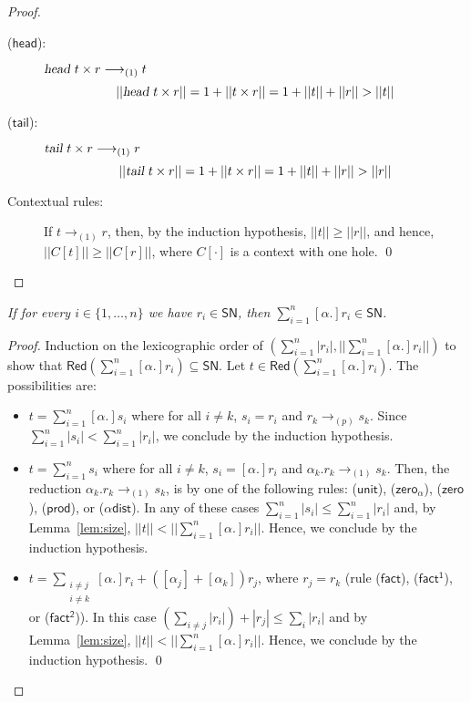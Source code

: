 \documentclass[preprint]{elsarticle}
\newcommand\size[1]{||#1||}
\newcommand\Red[1]{\mathsf{Red}(#1)}
\newcommand\SN{\mathsf{SN}}
\newcommand\lpl[1]{|#1|}
\newcommand\recap[3]{\noindent {\bf #1 \ref{#2}.} \emph{#3}}
\newcommand\lra[1][1]{\longrightarrow_{\left(#1\right)}}
\newcommand\lrap{\lra[p]}
\newcommand\s[1]{\ensuremath{\mathsf{#1}}}
\newcommand\head{\text{\sl head}}
\newcommand\tail{\text{\sl tail}}
\newcommand\may[1][\alpha]{[{#1}.]}
\newcommand\runit{(\s{unit})}
\newcommand\rzeros{(\s{zero_\alpha})}
\newcommand\rzero{(\s{zero})}
\newcommand\rprod{(\s{prod})}
\newcommand\rdists{(\s{\alpha dist})}
\newcommand\rfact{(\s{fact})}
\newcommand\rfacto{(\s{fact^1})}
\newcommand\rfactt{(\s{fact^2})}
\newcommand\rhead{(\s{head})}
\newcommand\rtail{(\s{tail})}
\begin{document}
\begin{proof}
\begin{description}
 \item[\rhead:] \( \head\ t \times r \lra t \)
   \[
     \size{\head\ t \times r} = 1 + \size{t \times r} = 1 + \size{t} + \size{r} > \size{t}
   \]
 \item[\rtail:] \( \tail\ {t \times r} \lra r \)
   \[
     \size{\tail\ {t \times r}} = 1 + \size{t \times r} = 1 + \size{t} + \size{r} > \size{r}
   \]
 \item[Contextual rules:] If $t\lra r$, then, by the induction hypothesis,
   $\size t\geq \size r$, and hence, $\size{C[t]}\geq \size{C[r]}$, where $C[\cdot]$ is
   a context with one hole.
    \qed
  \end{description}
\end{proof}

\recap{Lemma}{lem:ri_in_snset_implies_sum_ri_in_snset}{
  If for every \( i \in \{1, \ldots, n\} \) we have \( r_i \in \SN \),
  then \( \sum_{i = 1}^{n} \may r_i \in \SN \).
}
\begin{proof}
  Induction on the lexicographic order of \( (\sum_{i = 1}^{n} |r_i|,
  \size{\sum_{i = 1}^{n} \may r_i}) \) to show that \( \Red{\sum_{i =
      1}^{n}\may r_i} \subseteq \SN \). Let $t\in\Red{\sum_{i=1}^n\may r_i}$.
  The possibilities are:
  \begin{itemize}
  \item \( t = \sum_{i = 1}^n\may s_i \) where for all \( i \neq k \), \(
    s_i = r_i \) and \( r_k \lrap s_k \). Since \( \sum_{i = 1}^n
    \lpl{s_i} < \sum_{i = 1}^n \lpl{r_i} \), we conclude by the induction
    hypothesis.
  \item \( t = \sum_{i = 1}^n s_i \) where for all \( i \neq k \), \(
    s_i = \may r_i \) and \( \alpha_k . r_k \lra s_k \).
    Then, the reduction $\alpha_k . r_k\lra s_k$, is by one of the following
    rules: \runit, \rzeros, \rzero, \rprod, or \rdists.
    In any of these cases \( \sum_{i = 1}^{n} |s_i| \leq \sum_{i = 1}^{n} |r_i| \) and, by Lemma~\ref{lem:size}, \( \size{t} < \size{\sum_{i = 1}^{n}\may r_i} \). Hence, we conclude by the induction
    hypothesis.
  \item \( t = \sum_{\substack{i \neq j\\ i\neq k}}
    \may  r_i + ([\alpha_j] + [\alpha_k]) r_j \), where \( r_j = r_k \) (rule
    \rfact, \rfacto, or \rfactt). In this case \( (\sum_{i
      \neq j} |r_i|) + |r_j| \leq \sum_i |r_i| \) and by Lemma~\ref{lem:size},
    \( \size{t} < \size{\sum_{i = 1}^{n} \may r_i}\). Hence, we conclude by the
    induction hypothesis. \qed
  \end{itemize}
\end{proof}
\end{document}
